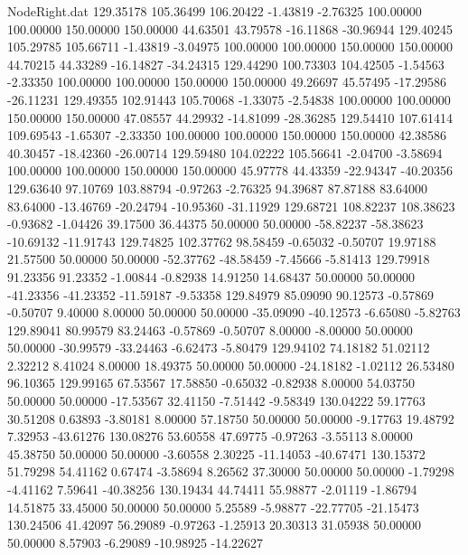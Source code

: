 \begin{filecontents}{NodeRight.dat}
 129.35178  105.36499  106.20422    -1.43819   -2.76325  100.00000  100.00000  150.00000  150.00000   44.63501   43.79578  -16.11868  -30.96944
 129.40245  105.29785  105.66711    -1.43819   -3.04975  100.00000  100.00000  150.00000  150.00000   44.70215   44.33289  -16.14827  -34.24315
 129.44290  100.73303  104.42505    -1.54563   -2.33350  100.00000  100.00000  150.00000  150.00000   49.26697   45.57495  -17.29586  -26.11231
 129.49355  102.91443  105.70068    -1.33075   -2.54838  100.00000  100.00000  150.00000  150.00000   47.08557   44.29932  -14.81099  -28.36285
 129.54410  107.61414  109.69543    -1.65307   -2.33350  100.00000  100.00000  150.00000  150.00000   42.38586   40.30457  -18.42360  -26.00714
 129.59480  104.02222  105.56641    -2.04700   -3.58694  100.00000  100.00000  150.00000  150.00000   45.97778   44.43359  -22.94347  -40.20356
 129.63640   97.10769  103.88794    -0.97263   -2.76325   94.39687   87.87188   83.64000   83.64000  -13.46769  -20.24794  -10.95360  -31.11929
 129.68721  108.82237  108.38623    -0.93682   -1.04426   39.17500   36.44375   50.00000   50.00000  -58.82237  -58.38623  -10.69132  -11.91743
 129.74825  102.37762   98.58459    -0.65032   -0.50707   19.97188   21.57500   50.00000   50.00000  -52.37762  -48.58459   -7.45666   -5.81413
 129.79918   91.23356   91.23352    -1.00844   -0.82938   14.91250   14.68437   50.00000   50.00000  -41.23356  -41.23352  -11.59187   -9.53358
 129.84979   85.09090   90.12573    -0.57869   -0.50707    9.40000    8.00000   50.00000   50.00000  -35.09090  -40.12573   -6.65080   -5.82763
 129.89041   80.99579   83.24463    -0.57869   -0.50707    8.00000   -8.00000   50.00000   50.00000  -30.99579  -33.24463   -6.62473   -5.80479
 129.94102   74.18182   51.02112     2.32212    8.41024    8.00000   18.49375   50.00000   50.00000  -24.18182   -1.02112   26.53480   96.10365
 129.99165   67.53567   17.58850    -0.65032   -0.82938    8.00000   54.03750   50.00000   50.00000  -17.53567   32.41150   -7.51442   -9.58349
 130.04222   59.17763   30.51208     0.63893   -3.80181    8.00000   57.18750   50.00000   50.00000   -9.17763   19.48792    7.32953  -43.61276
 130.08276   53.60558   47.69775    -0.97263   -3.55113    8.00000   45.38750   50.00000   50.00000   -3.60558    2.30225  -11.14053  -40.67471
 130.15372   51.79298   54.41162     0.67474   -3.58694    8.26562   37.30000   50.00000   50.00000   -1.79298   -4.41162    7.59641  -40.38256
 130.19434   44.74411   55.98877    -2.01119   -1.86794   14.51875   33.45000   50.00000   50.00000    5.25589   -5.98877  -22.77705  -21.15473
 130.24506   41.42097   56.29089    -0.97263   -1.25913   20.30313   31.05938   50.00000   50.00000    8.57903   -6.29089  -10.98925  -14.22627

\end{filecontents}
